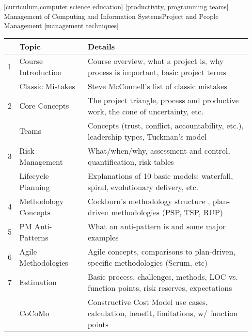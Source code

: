 \documentclass{sig-alternate}
\begin{document}
[curriculum,computer science education]
[productivity, programming teams]
 {Management of Computing and Information Systems}{Project and People Management} [management techniques]



\begin{table*}[t]
\centering
\caption{\textit{Process and Project Management} topics by week}
\label{table:topics}
\begin{tabular}{|p{0.25cm}|p{3.25cm}|p{13.0cm}|} \hline
\cellcolor[gray]{0.9}&\textbf{Topic}\cellcolor[gray]{0.9}&\textbf{Details}\cellcolor[gray]{0.9}\\ \hline
1&Course Introduction&Course overview, what a project is, why process is important, basic project terms\\ \hline
&Classic Mistakes&Steve McConnell's list of classic mistakes \cite{McConnell1996}\\ \hline
2&Core Concepts&The project triangle, process and productive work, the cone of uncertainty, etc.\\ \hline
&Teams&Concepts (trust, conflict, accountability, etc.), leadership types, Tuckman's \cite{Tuckman1965} model\\ \hline
3&Risk Management&What/when/why, assessment and control, quantification, risk tables\\ \hline
&Lifecycle Planning&Explanations of 10 basic models: waterfall, spiral, evolutionary delivery, etc.  \\ \hline
4&Methodology Concepts&Cockburn's methodology structure \cite{cockburn1997}, plan-driven methodologies (PSP, TSP, RUP)\\ \hline
5&PM Anti-Patterns&What an anti-pattern is and some major examples \cite{antipatterns2014}\\ \hline
6&Agile Methodologies&Agile concepts, comparisons to plan-driven, specific methodologies (Scrum, etc)\\ \hline
7&Estimation&Basic process, challenges, methods, LOC vs. function points, risk reserves, expectations\\ \hline
&CoCoMo&Constructive Cost Model \cite{Boehm1981} use cases, calculation, benefit, limitations, w/ function points\\ \hline

\end{tabular}
\end{table*}
\end{document}
